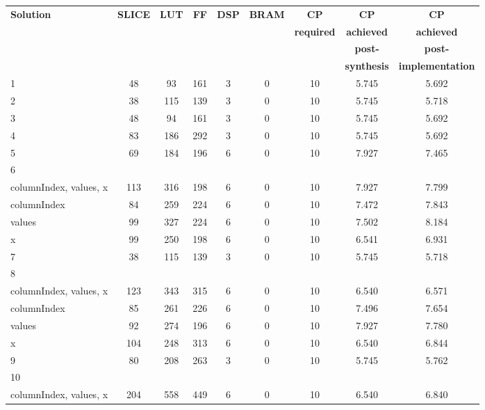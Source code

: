 \begin{table}[H]
	\centering
	\begin{tabular}{|l|c|c|c|c|c|c|c|c|}
		\hline
		\textbf{Solution} & \textbf{SLICE} & \textbf{LUT} & \textbf{FF} & \textbf{DSP} & \textbf{BRAM} & \textbf{CP} & \textbf{CP} & \textbf{CP} \\
		& & & & & & \textbf{required} & \textbf{achieved} & \textbf{achieved}\\
		& & & & & & & \textbf{post-} & \textbf{post-}\\
		& & & & & & & \textbf{synthesis} & \textbf{implementation}\\
		\hline
		1 & 48 & 93 & 161 & 3 & 0 & 10 & 5.745 & 5.692 \\
		\hline
		2 & 38 & 115 & 139 & 3 & 0 & 10 & 5.745 & 5.718 \\
		\hline
		3 & 48 & 94 & 161 & 3 & 0 & 10 & 5.745 & 5.692 \\
		\hline
		4 & 83 & 186 & 292 & 3 & 0 & 10 & 5.745 & 5.692 \\
		\hline
		5 & 69 & 184 & 196 & 6 & 0 & 10 & 7.927 & 7.465 \\
		\hline
		6 &  &  &  &  &  &  &  &  \\
		\tabitem columnIndex, values, x & 113 & 316 & 198 & 6 & 0 & 10 & 7.927 & 7.799 \\
		\tabitem columnIndex & 84 & 259 & 224 & 6 & 0 & 10 & 7.472 & 7.843 \\
		\tabitem values & 99 & 327 & 224 & 6 & 0 & 10 & 7.502 & 8.184 \\
		\tabitem x & 99 & 250 & 198 & 6 & 0 & 10 & 6.541 & 6.931 \\
		\hline
		7 & 38 & 115 & 139 & 3 & 0 & 10 & 5.745 & 5.718 \\
		\hline
		8 &  &  &  &  &  &  &  &  \\
		\tabitem columnIndex, values, x & 123 & 343 & 315 & 6 & 0 & 10 & 6.540 & 6.571 \\
		\tabitem columnIndex & 85 & 261 & 226 & 6 & 0 & 10 & 7.496 & 7.654 \\
		\tabitem values & 92 & 274 & 196 & 6 & 0 & 10 & 7.927 & 7.780 \\
		\tabitem x & 104 & 248 & 313 & 6 & 0 & 10 & 6.540 & 6.844 \\
		\hline
		9 & 80 & 208 & 263 & 3 & 0 & 10 & 5.745 & 5.762 \\
		\hline
		10 &  &  &  &  &  &  &  &  \\
		\tabitem columnIndex, values, x & 204 & 558 & 449 & 6 & 0 & 10 & 6.540 & 6.840 \\

\end{tabular}
\end{table}
